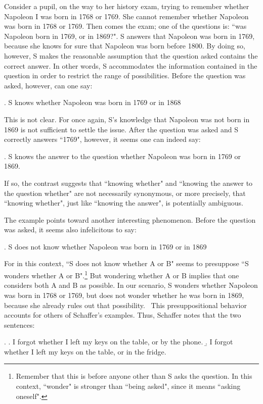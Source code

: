 Consider a pupil, on the way to her history exam, trying to
remember whether Napoleon I was born in 1768 or 1769. She cannot
remember whether Napoleon was born in 1768 or 1769. Then comes the
exam; one of the questions is: ``was Napoleon born in 1769, or in
1869?". S answers that Napoleon was born in 1769, because she
knows for sure that Napoleon was born before 1800. By doing so,
however, S makes the reasonable assumption that the question asked
contains the correct answer. In other words, S accommodates the
information contained in the question in order to restrict the
range of possibilities. Before the question was asked, however,
can one say:

\ex. S knows whether Napoleon was born in 1769 or in 1868

This is not clear. For once again, S's knowledge that Napoleon was
not born in 1869 is not sufficient to settle the issue. After the
question was asked and S correctly answers ``1769", however, it
seems one can indeed say:

\ex. S knows the answer to the question whether Napoleon was born
in 1769 or 1869.

\noindent If so, the contrast suggests that ``knowing whether" and
``knowing the answer to the question whether" are not necessarily
synonymous, or more precisely, that ``knowing whether", just like
``knowing the answer", is potentially ambiguous.

The example points toward another interesting phenomenon. Before
the question was asked, it seems also infelicitous to say:

\ex. S does not know whether Napoleon was born in 1769 or in 1869

For in this context, ``S does not know whether A or B" seems to
presuppose ``S wonders whether A or B".\footnote{Remember that
this is before anyone other than S asks the question. In this
context, ``wonder" is stronger than ``being asked", since it means
``asking oneself".} But wondering whether A or B implies that one
considers both A and B as possible. In our scenario, S wonders
whether Napoleon was born in 1768 or 1769, but does not wonder
whether he was born in 1869, because she already rules out that
possibility.
\ This presuppositional behavior accounts for others of Schaffer's
examples. Thus, Schaffer notes that the two sentences:

\ex. \a. \label{phone} I forgot whether I left my keys on the
table, or by the phone. \b. \label{fridge} I forgot whether I left
my keys on the table, or in the fridge.

